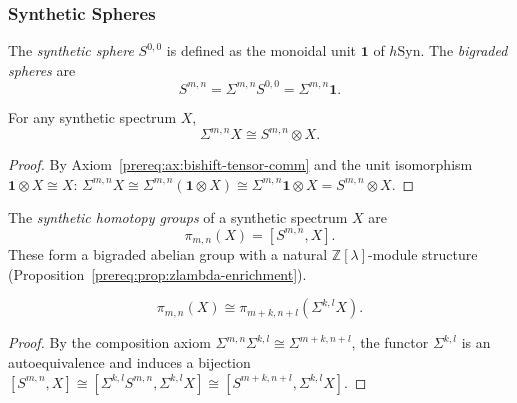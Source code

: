 \subsubsection{Synthetic Spheres}\label{sec:prereq-syn-spheres}

\begin{definition}\label{prereq:def:bigraded-spheres}
    \leanok
    The \emph{synthetic sphere} $S^{0,0}$ is defined as the monoidal unit $\mathbf{1}$ of $h\mathrm{Syn}$. The \emph{bigraded spheres} are
    $$S^{m,n} = \Sigma^{m,n} S^{0,0} = \Sigma^{m,n}\mathbf{1}.$$
\end{definition}

\begin{proposition}\label{prereq:prop:bishift-tensor-sphere}
    For any synthetic spectrum $X$,
    $$\Sigma^{m,n}X \cong S^{m,n} \otimes X.$$
\end{proposition}
\begin{proof}
    By Axiom~\ref{prereq:ax:bishift-tensor-comm} and the unit isomorphism $\mathbf{1} \otimes X \cong X$:
    $\Sigma^{m,n}X \cong \Sigma^{m,n}(\mathbf{1} \otimes X) \cong \Sigma^{m,n}\mathbf{1} \otimes X = S^{m,n} \otimes X$.
\end{proof}

\begin{definition}\label{prereq:def:synthetic-homotopy-groups}
    \leanok
    The \emph{synthetic homotopy groups} of a synthetic spectrum $X$ are
    $$\pi_{m,n}(X) = [S^{m,n}, X].$$
    These form a bigraded abelian group with a natural $\mathbb{Z}[\lambda]$-module structure (Proposition~\ref{prereq:prop:zlambda-enrichment}).
\end{definition}

\begin{proposition}\label{prereq:prop:synthetic-homotopy-shift}
    \leanok
    $$\pi_{m,n}(X) \cong \pi_{m+k,n+l}(\Sigma^{k,l}X).$$
\end{proposition}
\begin{proof}
    By the composition axiom $\Sigma^{m,n}\Sigma^{k,l} \cong \Sigma^{m+k,n+l}$, the functor $\Sigma^{k,l}$ is an autoequivalence and induces a bijection $[S^{m,n}, X] \cong [\Sigma^{k,l}S^{m,n}, \Sigma^{k,l}X] \cong [S^{m+k,n+l}, \Sigma^{k,l}X]$.
\end{proof}

